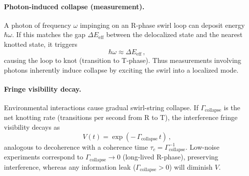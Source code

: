 \documentclass[11pt]{article}
\begin{document}
\paragraph{Photon-induced collapse (measurement).}
    A photon of frequency $\omega$ impinging on an R-phase swirl loop can deposit energy $\hbar\omega$. If this matches the gap $\Delta E_{\text{eff}}$ between the delocalized state and the nearest knotted state, it triggers
    \[
        \hbar\omega \approx \Delta E_{\text{eff}}\,,
    \]
    causing the loop to knot (transition to T-phase). Thus measurements involving photons inherently induce collapse by exciting the swirl into a localized mode.

\paragraph{Fringe visibility decay.}
    Environmental interactions cause gradual swirl-string collapse. If $\Gamma_{\text{collapse}}$ is the net knotting rate (transitions per second from R to T), the interference fringe visibility decays as
    \[
        V(t) = \exp(-\,\Gamma_{\text{collapse}}\,t)\,,
    \]
    analogous to decoherence with a coherence time $\tau_c = \Gamma_{\text{collapse}}^{-1}$. Low-noise experiments correspond to $\Gamma_{\text{collapse}}\to 0$ (long-lived R-phase), preserving interference, whereas any information leak ($\Gamma_{\text{collapse}}>0$) will diminish $V$.

\end{document}
